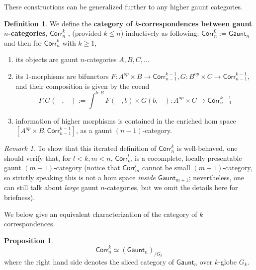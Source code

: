 \documentclass{article}
\theoremstyle{definition}
\newtheorem{mydef}{Definition}[section]
\newtheorem{prop}{Proposition}[section]
\theoremstyle{remark}
\newtheorem*{remark}{Remark}
\begin{document}
These constructions can be generalized further to any higher gaunt categories.

\begin{mydef}
We define the \textbf{category of $k$-correspondences between gaunt $n$-categories}, $\mathsf{Corr}^k_n$ , (provided $k \leq n$) inductively as following: $\mathsf{Corr}^0_n:=\mathsf{Gaunt}_n$ and then for $\mathsf{Corr}^k_n$ with $k \geq 1$,
\begin{enumerate}
    \item its objects are gaunt $n$-categories  $A,B,C,\dots$
    \item its $1$-morphisms are bifunctors $F:A^{op}\times B \to \mathsf{Corr}^{k-1}_{n-1}, G:B^{op} \times C \to \mathsf{Corr}^{k-1}_{n-1}$, and their composition is given by the coend $$ F.G(-,-):= \int^{b:B}{F(-,b)\times G(b,-)}:A^{op} \times C \to \mathsf{Corr}^{k-1}_{n-1}$$
    \item information of higher morphisms is contained in the enriched hom space $[A^{op} \times B,\mathsf{Corr}^{k-1}_{n-1}]$, as a gaunt $(n-1)$-category.
\end{enumerate}
\end{mydef}

\begin{remark}
To show that this iterated definition of $\mathsf{Corr}^k_n$ is well-behaved, one should verify that, for $l<k,m<n$, $\mathsf{Corr}^l_m$ is a cocomplete, locally presentable gaunt $(m+1)$-category (notice that $\mathsf{Corr}^l_m$ cannot be small $(m+1)$-category, so strictly speaking this is not a hom space \textit{inside} $\mathsf{Gaunt}_{m+1}$; nevertheless, one can still talk about \textit{large} gaunt $n$-categories, but we omit the details here for briefness).
\end{remark}

We below give an equivalent characterization of the category of $k$ correspondences.

\begin{prop}
$$\mathsf{Corr}^k_n \simeq (\mathsf{Gaunt}_n)_{/G_k}$$ where the right hand side denotes the sliced category of $\mathsf{Gaunt}_n$ over $k$-globe $G_k$.
\end{prop}
\end{document}
